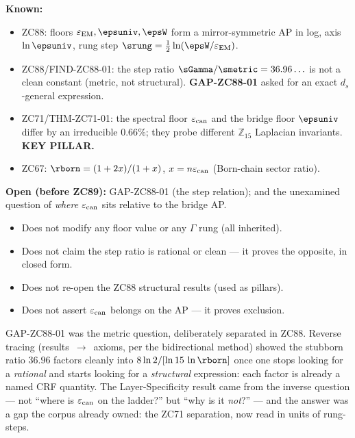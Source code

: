 \documentclass[12pt, a4paper]{article}
\renewcommand{\epsEM}{\varepsilon_{\rm EM}}     %
\renewcommand{\epscan}{\varepsilon_{\rm can}}   %
\begin{document}
\begin{keybox}[title={Pre-ZC89 Status}]
\textbf{Known:}
\begin{itemize}[leftmargin=2em, noitemsep]
  \item ZC88: floors $\epsEM,\epsuniv,\epsW$ form a mirror-symmetric AP in
    log, axis $\ln\epsuniv$, rung step $\srung=\tfrac12\ln(\epsW/\epsEM)$.
  \item ZC88/FIND-ZC88-01: the step ratio $\sGamma/\smetric=36.96\ldots$ is
    not a clean constant (metric, not structural). \textbf{GAP-ZC88-01}
    asked for an exact $d_s$-general expression.
  \item ZC71/THM-ZC71-01: the spectral floor $\epscan$ and the bridge floor
    $\epsuniv$ differ by an irreducible $0.66\%$; they probe different
    $\mathbb{Z}_{15}$ Laplacian invariants. \textbf{KEY PILLAR.}
  \item ZC67: $\rborn=(1+2x)/(1+x)$, $x=n\epscan$ (Born-chain sector ratio).
\end{itemize}
\textbf{Open (before ZC89):} GAP-ZC88-01 (the step relation); and the
unexamined question of \emph{where} $\epscan$ sits relative to the bridge AP.
\end{keybox}

\begin{keybox}[title={What ZC89 Does NOT Do}]
\begin{itemize}[leftmargin=2em, noitemsep]
  \item Does not modify any floor value or any $\Gamma$ rung (all inherited).
  \item Does not claim the step ratio is rational or clean --- it proves the
    opposite, in closed form.
  \item Does not re-open the ZC88 structural results (used as pillars).
  \item Does not assert $\epscan$ belongs on the AP --- it proves exclusion.
\end{itemize}
\end{keybox}

\begin{derivedbox}[title={Discovery Note}]
GAP-ZC88-01 was the metric question, deliberately separated in ZC88.
Reverse tracing (results~$\to$~axioms, per the bidirectional method) showed
the stubborn ratio $36.96$ factors cleanly into $8\ln2/[\ln15\,\ln\rborn]$
once one stops looking for a \emph{rational} and starts looking for a
\emph{structural} expression: each factor is already a named CRF quantity.
The Layer-Specificity result came from the inverse question --- not ``where
is $\epscan$ on the ladder?'' but ``why is it \emph{not}?'' --- and the
answer was a gap the corpus already owned: the ZC71 separation, now read in
units of rung-steps.
\end{derivedbox}
\end{document}
